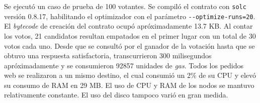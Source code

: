 Se ejecut\'o un caso de prueba de 100 votantes. Se compil\'o el contrato con \texttt{solc} versi\'on 0.8.17, habilitando el optimizador  con el par\'ametro \lstinline{--optimize-runs=20}.   El \textit{bytecode} de creaci\'on del contrato ocup\'o apr\'oximadamente 13.7 KB.  Al contar los votos,   21 candidatos resultan empatados en el primer lugar con un total de 30 votos cada uno.   Desde que se consult\'o por el ganador de la votaci\'on hasta que se obtuvo una respuesta  satisfactoria, transcurrieron 300 milisegundos apr\'oximadamente y se consumieron 92857 unidades de \textit{gas}.  Todos los pedidos web se realizaron a un mismo destino, el cual consumi\'o un 2\% de su CPU y elev\'o su consumo de RAM en 29 MB. El uso de CPU y RAM de los nodos se mantuvo relativamente constante. El uso del disco tampoco vari\'o en gran medida. 

